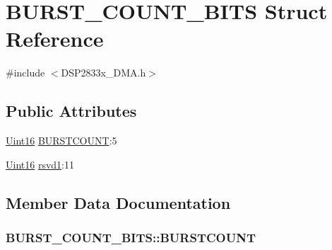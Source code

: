\hypertarget{struct_b_u_r_s_t___c_o_u_n_t___b_i_t_s}{}\section{B\+U\+R\+S\+T\+\_\+\+C\+O\+U\+N\+T\+\_\+\+B\+I\+T\+S Struct Reference}
\label{struct_b_u_r_s_t___c_o_u_n_t___b_i_t_s}


{\ttfamily \#include $<$D\+S\+P2833x\+\_\+\+D\+M\+A.\+h$>$}

\subsection*{Public Attributes}
\begin{DoxyCompactItemize}
\item 
\hyperlink{_d_s_p2833x___device_8h_a59a9f6be4562c327cbfb4f7e8e18f08b}{Uint16} \hyperlink{struct_b_u_r_s_t___c_o_u_n_t___b_i_t_s_a5e7355b1db52fbf5bcb9daaaf5d1446c}{B\+U\+R\+S\+T\+C\+O\+U\+N\+T}\+:5
\item 
\hyperlink{_d_s_p2833x___device_8h_a59a9f6be4562c327cbfb4f7e8e18f08b}{Uint16} \hyperlink{struct_b_u_r_s_t___c_o_u_n_t___b_i_t_s_ae9c02ec4a830e742326b8a60c99f5740}{rsvd1}\+:11
\end{DoxyCompactItemize}


\subsection{Member Data Documentation}
\hypertarget{struct_b_u_r_s_t___c_o_u_n_t___b_i_t_s_a5e7355b1db52fbf5bcb9daaaf5d1446c}{}
\subsubsection[{B\+U\+R\+S\+T\+C\+O\+U\+N\+T}]{ B\+U\+R\+S\+T\+\_\+\+C\+O\+U\+N\+T\+\_\+\+B\+I\+T\+S\+::\+B\+U\+R\+S\+T\+C\+O\+U\+N\+T}\label{struct_b_u_r_s_t___c_o_u_n_t___b_i_t_s_a5e7355b1db52fbf5bcb9daaaf5d1446c}
\hypertarget{struct_b_u_r_s_t___c_o_u_n_t___b_i_t_s_ae9c02ec4a830e742326b8a60c99f5740}{}
